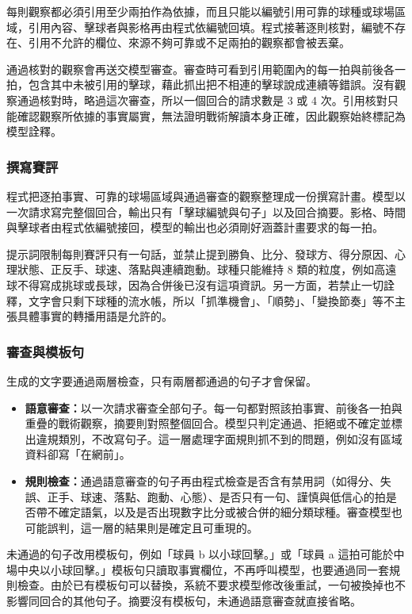 每則觀察都必須引用至少兩拍作為依據，而且只能以編號引用可靠的球種或球場區域，引用內容、擊球者與影格再由程式依編號回填。程式接著逐則核對，編號不存在、引用不允許的欄位、來源不夠可靠或不足兩拍的觀察都會被丟棄。

通過核對的觀察會再送交模型審查。審查時可看到引用範圍內的每一拍與前後各一拍，包含其中未被引用的擊球，藉此抓出把不相連的擊球說成連續等錯誤。沒有觀察通過核對時，略過這次審查，所以一個回合的請求數是 3 或 4 次。引用核對只能確認觀察所依據的事實屬實，無法證明戰術解讀本身正確，因此觀察始終標記為模型詮釋。

\subsubsection{撰寫賽評}

程式把逐拍事實、可靠的球場區域與通過審查的觀察整理成一份撰寫計畫。模型以一次請求寫完整個回合，輸出只有「擊球編號與句子」以及回合摘要。影格、時間與擊球者由程式依編號接回，模型的輸出也必須剛好涵蓋計畫要求的每一拍。

提示詞限制每則賽評只有一句話，並禁止提到勝負、比分、發球方、得分原因、心理狀態、正反手、球速、落點與連續跑動。球種只能維持 8 類的粒度，例如高遠球不得寫成挑球或長球，因為合併後已沒有這項資訊。另一方面，若禁止一切詮釋，文字會只剩下球種的流水帳，所以「抓準機會」、「順勢」、「變換節奏」等不主張具體事實的轉播用語是允許的。

\subsubsection{審查與模板句}

生成的文字要通過兩層檢查，只有兩層都通過的句子才會保留。

\begin{itemize}
  \item \textbf{語意審查：}以一次請求審查全部句子。每一句都對照該拍事實、前後各一拍與重疊的戰術觀察，摘要則對照整個回合。模型只判定通過、拒絕或不確定並標出違規類別，不改寫句子。這一層處理字面規則抓不到的問題，例如沒有區域資料卻寫「在網前」。
  \item \textbf{規則檢查：}通過語意審查的句子再由程式檢查是否含有禁用詞（如得分、失誤、正手、球速、落點、跑動、心態）、是否只有一句、謹慎與低信心的拍是否帶不確定語氣，以及是否出現數字比分或被合併的細分類球種。審查模型也可能誤判，這一層的結果則是確定且可重現的。
\end{itemize}

未通過的句子改用模板句，例如「球員 b 以小球回擊。」或「球員 a 這拍可能於中場中央以小球回擊。」模板句只讀取事實欄位，不再呼叫模型，也要通過同一套規則檢查。由於已有模板句可以替換，系統不要求模型修改後重試，一句被換掉也不影響同回合的其他句子。摘要沒有模板句，未通過語意審查就直接省略。

